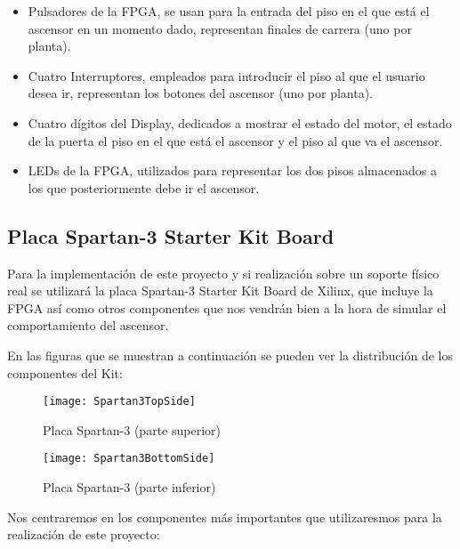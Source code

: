 \begin{itemize}
\begin{itemize}
     	   	\item Pulsadores de la FPGA, se usan para la entrada del piso en el que está el ascensor en un momento dado, representan finales de carrera (uno por planta).
    		    \item Cuatro Interruptores, empleados para introducir el piso al que el usuario desea ir, representan los botones del ascensor (uno por planta).
    		    \item Cuatro dígitos del Display, dedicados a mostrar el estado del motor, el estado de la puerta el piso en el que está el ascensor y el piso al que va el ascensor.
    		    \item LEDs de la FPGA, utilizados para representar los dos pisos almacenados a los que posteriormente debe ir el ascensor.
    	\end{itemize}
	\end{itemize}

\subsection{Placa Spartan-3 Starter Kit Board} \label{subsection:Spartan-3}
    
    Para la implementación de este proyecto y si realización sobre un soporte físico real se utilizará la placa Spartan-3 Starter Kit Board de Xilinx, que incluye la FPGA así como otros componentes que nos vendrán bien a la hora de simular el comportamiento del ascensor.

    En las figuras que se muestran a continuación se pueden ver la distribución de los componentes del Kit:

    \begin{figure}[H]
            \centering
            \texttt{[image: Spartan3TopSide]}
            \caption{Placa Spartan-3 (parte superior)}
            \label{fig:Spartan3TopSide}
    \end{figure}

    \begin{figure}[H]
            \centering
            \texttt{[image: Spartan3BottomSide]}
            \caption{Placa Spartan-3 (parte inferior)}
            \label{fig:Spartan3BottomSide}
    \end{figure}

    Nos centraremos en los componentes más importantes que utilizaresmos para la realización de este proyecto:

